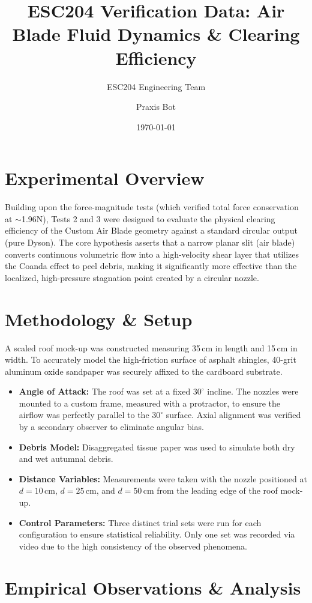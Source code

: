 \documentclass{article}
\title{ESC204 Verification Data: Air Blade Fluid Dynamics \& Clearing Efficiency}
\author{ESC204 Engineering Team \and Praxis Bot}
\date{\today}
\begin{document}
\maketitle

\section{Experimental Overview}
Building upon the force-magnitude tests (which verified total force conservation at $\sim$1.96N), Tests 2 and 3 were designed to evaluate the physical clearing efficiency of the Custom Air Blade geometry against a standard circular output (pure Dyson). The core hypothesis asserts that a narrow planar slit (air blade) converts continuous volumetric flow into a high-velocity shear layer that utilizes the Coanda effect to peel debris, making it significantly more effective than the localized, high-pressure stagnation point created by a circular nozzle.

\section{Methodology \& Setup}
A scaled roof mock-up was constructed measuring 35\,cm in length and 15\,cm in width. To accurately model the high-friction surface of asphalt shingles, 40-grit aluminum oxide sandpaper was securely affixed to the cardboard substrate. 
\begin{itemize}
    \item \textbf{Angle of Attack:} The roof was set at a fixed $30^\circ$ incline. The nozzles were mounted to a custom frame, measured with a protractor, to ensure the airflow was perfectly parallel to the $30^\circ$ surface. Axial alignment was verified by a secondary observer to eliminate angular bias.
    \item \textbf{Debris Model:} Disaggregated tissue paper was used to simulate both dry and wet autumnal debris.
    \item \textbf{Distance Variables:} Measurements were taken with the nozzle positioned at $d = 10\,$cm, $d = 25\,$cm, and $d = 50\,$cm from the leading edge of the roof mock-up.
    \item \textbf{Control Parameters:} Three distinct trial sets were run for each configuration to ensure statistical reliability. Only one set was recorded via video due to the high consistency of the observed phenomena. 
\end{itemize}

\section{Empirical Observations \& Analysis}
\end{document}
